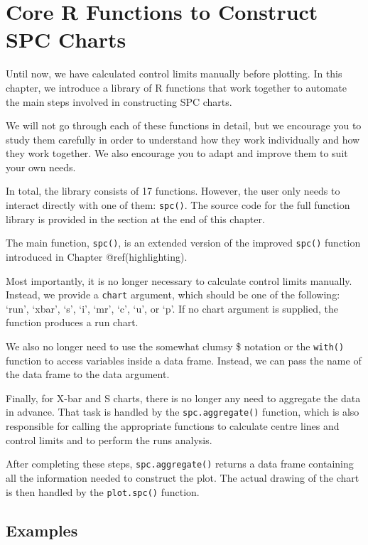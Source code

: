 \documentclass[
]{book}
\begin{document}
\chapter{Core R Functions to Construct SPC Charts}\label{r-functions}

Until now, we have calculated control limits manually before plotting.
In this chapter, we introduce a library of R functions that work
together to automate the main steps involved in constructing SPC charts.

We will not go through each of these functions in detail, but we
encourage you to study them carefully in order to understand how they
work individually and how they work together. We also encourage you to
adapt and improve them to suit your own needs.

In total, the library consists of 17 functions. However, the user only
needs to interact directly with one of them: \texttt{spc()}. The source
code for the full function library is provided in the section at the end
of this chapter.

The main function, \texttt{spc()}, is an extended version of the
improved \texttt{spc()} function introduced in Chapter
@ref(highlighting).

Most importantly, it is no longer necessary to calculate control limits
manually. Instead, we provide a \texttt{chart} argument, which should be
one of the following: `run', `xbar', `s', `i', `mr', `c', `u', or `p'.
If no chart argument is supplied, the function produces a run chart.

We also no longer need to use the somewhat clumsy \$ notation or the
\texttt{with()} function to access variables inside a data frame.
Instead, we can pass the name of the data frame to the data argument.

Finally, for X-bar and S charts, there is no longer any need to
aggregate the data in advance. That task is handled by the
\texttt{spc.aggregate()} function, which is also responsible for calling
the appropriate functions to calculate centre lines and control limits
and to perform the runs analysis.

After completing these steps, \texttt{spc.aggregate()} returns a data
frame containing all the information needed to construct the plot. The
actual drawing of the chart is then handled by the \texttt{plot.spc()}
function.

\section{Examples}\label{examples}
\end{document}
